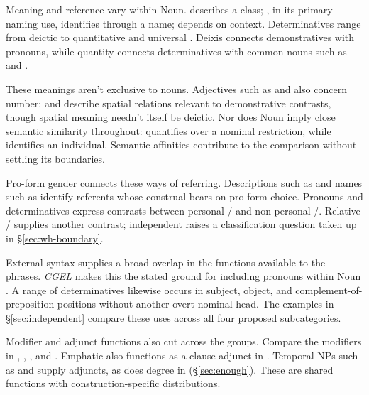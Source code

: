 \documentclass[12pt]{article}
\begin{document}
Meaning and reference vary within Noun.  describes a class; , in its primary naming use, identifies through a name;  depends on context. Determinatives range from deictic  to quantitative  and universal  \citep[358--360, 370--405, 425--428, 515--521]{huddleston2002}. Deixis connects demonstratives with pronouns, while quantity connects determinatives with common nouns such as  and .

These meanings aren't exclusive to nouns. Adjectives such as  and  also concern number;  and  describe spatial relations relevant to demonstrative contrasts, though spatial meaning needn't itself be deictic. Nor does Noun imply close semantic similarity throughout:  quantifies over a nominal restriction, while  identifies an individual. Semantic affinities contribute to the comparison without settling its boundaries.

Pro-form gender \citep{reynolds2025proformgender} connects these ways of referring. Descriptions such as  and names such as  identify referents whose construal bears on pro-form choice. Pronouns and determinatives express contrasts between personal / and non-personal /. Relative / supplies another contrast; independent  raises a classification question taken up in §\ref{sec:wh-boundary}.

External syntax supplies a broad overlap in the functions available to the phrases. \textit{CGEL} makes this the stated ground for including pronouns within Noun \citep[327]{huddleston2002}. A range of determinatives likewise occurs in subject, object, and complement-of-preposition positions without another overt nominal head. The examples in §\ref{sec:independent} compare these uses across all four proposed subcategories.

Modifier and adjunct functions also cut across the groups. Compare the modifiers in , , , and . Emphatic  also functions as a clause adjunct in  \citep[1496--1497]{huddleston2002}. Temporal NPs such as  and  supply adjuncts, as does degree  in  (§\ref{sec:enough}). These are shared functions with construction-specific distributions.
\end{document}
